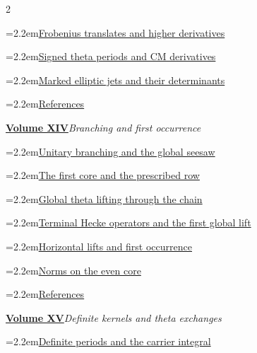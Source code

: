\documentclass[a4paper,11pt]{article}
\theoremstyle{definition}
\theoremstyle{remark}
\numberwithin{equation}{section}
\begin{document}
\begin{multicols}{2}
\begin{minipage}{\linewidth}
\noindent\hangindent=2.2em\hyperref[nav:g-V-2]{Frobenius translates and higher derivatives}\par
\noindent\hangindent=2.2em\hyperref[nav:g-V-3]{Signed theta periods and CM derivatives}\par
\noindent\hangindent=2.2em\hyperref[nav:chapter-split-elliptic-jets]{Marked elliptic jets and their determinants}\par
\noindent\hangindent=2.2em\hyperref[nav:bibliography-XIII]{References}\par
\end{minipage}\par\medskip
\noindent\begin{minipage}{\linewidth}\raggedright
\textbf{\hyperref[nav:volume-XIV]{Volume XIV}}\enspace\emph{Branching and first occurrence}\par\smallskip
\noindent\hangindent=2.2em\hyperref[nav:g-VI-0]{Unitary branching and the global seesaw}\par
\noindent\hangindent=2.2em\hyperref[nav:g-VI-1]{The first core and the prescribed row}\par
\noindent\hangindent=2.2em\hyperref[nav:g-VI-2]{Global theta lifting through the chain}\par
\noindent\hangindent=2.2em\hyperref[nav:first-global-lift]{Terminal Hecke operators and the first global lift}\par
\noindent\hangindent=2.2em\hyperref[nav:g-VI-3]{Horizontal lifts and first occurrence}\par
\noindent\hangindent=2.2em\hyperref[nav:g-VI-4]{Norms on the even core}\par
\noindent\hangindent=2.2em\hyperref[nav:bibliography-XIV]{References}\par
\end{minipage}\par\medskip
\noindent\begin{minipage}{\linewidth}\raggedright
\textbf{\hyperref[nav:volume-XV]{Volume XV}}\enspace\emph{Definite kernels and theta exchanges}\par\smallskip
\noindent\hangindent=2.2em\hyperref[nav:carrier-integral]{Definite periods and the carrier integral}\par

\end{minipage}
\end{multicols}
\end{document}
